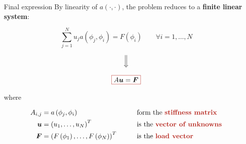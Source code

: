 \documentclass[10pt,externalviewer]{beamer}
\begin{document}
\begin{frame}{Final expression}
   By linearity of $a(\cdot,\cdot)$, the problem reduces to a \textbf{finite linear system}:

   \begin{equation*}
      \sum_{j=1}^Nu_ja\left(\phi_j,\phi_i\right)=F\left(\phi_i\right) \qquad \forall i=1,\dots,N
   \end{equation*}

   \vspace{-0.1cm}

   \begin{equation*}
      \Big\Downarrow
   \end{equation*}

   \vspace{-0.1cm}

   \begin{equation*}
      \fcolorbox{BrickRed}{white}{\text{$A\boldsymbol{u}=\boldsymbol{F}$}}
   \end{equation*}

   \pause

   where

   \begin{alignat*}{2}
      A_{i,j}&=a\left(\phi_j,\phi_i\right) &&\text{form the \textbf{\textcolor{BrickRed}{stiffness matrix}}}\\
      \boldsymbol{u}&=\left(u_1,\dots,u_N\right)^T &&\text{is the \textbf{\textcolor{BrickRed}{vector of unknowns}}}\\
      \boldsymbol{F}&=\left(F\left(\phi_1\right),\dots,F\left(\phi_N\right)\right)^T \qquad &&\text{is the \textbf{\textcolor{BrickRed}{load vector}}} 
   \end{alignat*}
\end{frame}
\end{document}

